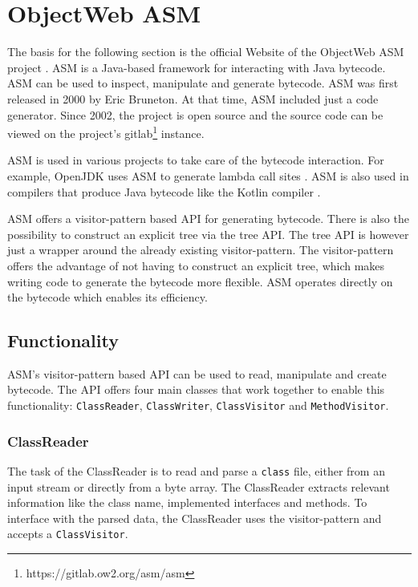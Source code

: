 \section{ObjectWeb ASM}

The basis for the following section is the official Website of the ObjectWeb ASM project \parencite{ASMWeb2024}. ASM is a Java-based framework for interacting with Java bytecode. ASM can be used to inspect, manipulate and generate bytecode. ASM was first released in 2000 by Eric Bruneton. At that time, ASM included just a code generator. Since 2002, the project is open source and the source code can be viewed on the project's gitlab\footnote{https://gitlab.ow2.org/asm/asm} instance. 

ASM is used in various projects to take care of the bytecode interaction. For example, OpenJDK uses ASM to generate lambda call sites \parencite{OpenJdk2024}. ASM is also used in compilers that produce Java bytecode like the Kotlin compiler \parencite{Kotlin2024}. 

ASM offers a visitor-pattern based API for generating bytecode. There is also the possibility to construct an explicit tree via the tree API. The tree API is however just a wrapper around the already existing visitor-pattern. The visitor-pattern offers the advantage of not having to construct an explicit tree, which makes writing code to generate the bytecode more flexible. ASM operates directly on the bytecode which enables its efficiency.     

\subsection{Functionality}

ASM's visitor-pattern based API can be used to read, manipulate and create bytecode. The API offers four main classes that work together to enable this functionality: \texttt{ClassReader}, \texttt{ClassWriter}, \texttt{ClassVisitor} and \texttt{MethodVisitor}. 

\subsubsection{ClassReader}

The task of the ClassReader is to read and parse a \texttt{class} file, either from an input stream or directly from a byte array. The ClassReader extracts relevant information like the class name, implemented interfaces and methods. To interface with the parsed data, the ClassReader uses the visitor-pattern and accepts a \texttt{ClassVisitor}. 

